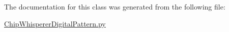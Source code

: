 The documentation for this class was generated from the following file\+:\begin{DoxyCompactItemize}
\item 
\hyperlink{ChipWhispererDigitalPattern_8py}{Chip\+Whisperer\+Digital\+Pattern.\+py}\end{DoxyCompactItemize}
